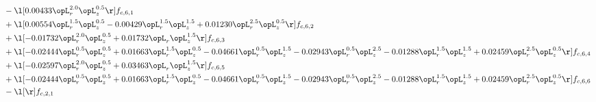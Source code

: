 \begin{alignat}{2}
& - \l[  0.00433 \opL_r^{2.0} \opL_z^{0.5}  \r] f_{c,6,1} \nonumber \\ 
& + \l[  0.00554 \opL_r^{1.5} \opL_z^{0.5}   -0.00429 \opL_r^{1.5} \opL_z^{1.5} +  0.01230 \opL_r^{2.5} \opL_z^{0.5}  \r] f_{c,6,2} \nonumber \\ 
& + \l[  -0.01732 \opL_r^{2.0} \opL_z^{0.5} +  0.01732 \opL_r \opL_z^{1.5}  \r] f_{c,6,3} \nonumber \\ 
& + \l[  -0.02444 \opL_r^{0.5} \opL_z^{0.5} +  0.01663 \opL_r^{1.5} \opL_z^{0.5}   -0.04661 \opL_r^{0.5} \opL_z^{1.5}   -0.02943 \opL_r^{0.5} \opL_z^{2.5}   -0.01288 \opL_r^{1.5} \opL_z^{1.5} +  0.02459 \opL_r^{2.5} \opL_z^{0.5}  \r] f_{c,6,4} \nonumber \\ 
& + \l[  -0.02597 \opL_r^{2.0} \opL_z^{0.5} +  0.03463 \opL_r \opL_z^{1.5}  \r] f_{c,6,5} \nonumber \\ 
& + \l[  -0.02444 \opL_r^{0.5} \opL_z^{0.5} +  0.01663 \opL_r^{1.5} \opL_z^{0.5}   -0.04661 \opL_r^{0.5} \opL_z^{1.5}   -0.02943 \opL_r^{0.5} \opL_z^{2.5}   -0.01288 \opL_r^{1.5} \opL_z^{1.5} +  0.02459 \opL_r^{2.5} \opL_z^{0.5}  \r] f_{c,6,6} \nonumber \\ 
& - \l[  \r] f_{c,2,1} \nonumber \\ 
\end{alignat} 


